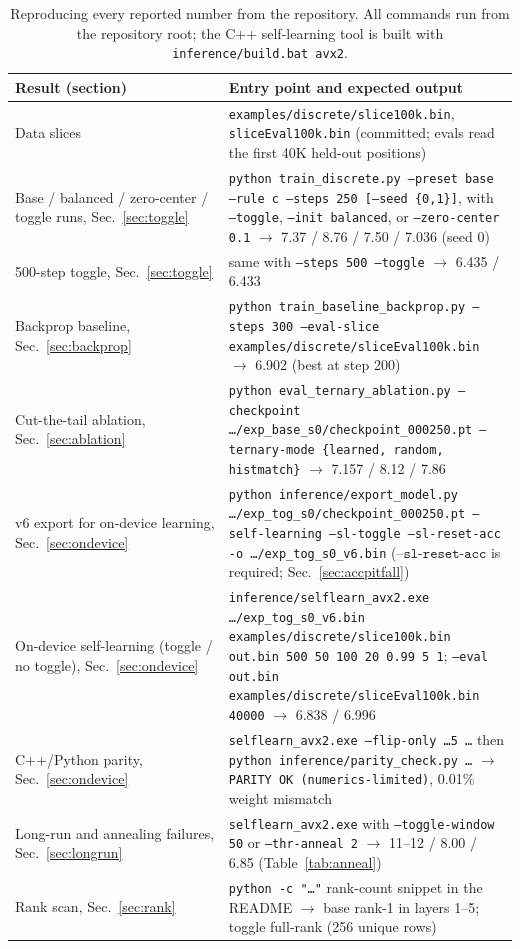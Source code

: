 \documentclass{article} %
\begin{document}
\begin{table}[t]
\caption{Reproducing every reported number from the repository. All commands run from the repository root; the C++ self-learning tool is built with \texttt{inference/build.bat avx2}.}
\label{tab:repro}
\begin{center}
\begin{tabular}{p{0.42\linewidth}p{0.58\linewidth}}
\toprule
\textbf{Result (section)} & \textbf{Entry point and expected output} \\
\midrule
Data slices & \texttt{examples/discrete/slice100k.bin}, \texttt{sliceEval100k.bin} (committed; evals read the first 40K held-out positions) \\
\hline
Base / balanced / zero-center / toggle runs, Sec.~\ref{sec:toggle} & \texttt{python train\_discrete.py --preset base --rule c --steps 250 [--seed \{0,1\}]}, with \texttt{--toggle}, \texttt{--init balanced}, or \texttt{--zero-center 0.1} $\rightarrow$ 7.37 / 8.76 / 7.50 / 7.036 (seed 0) \\
\hline
500-step toggle, Sec.~\ref{sec:toggle} & same with \texttt{--steps 500 --toggle} $\rightarrow$ 6.435 / 6.433 \\
\hline
Backprop baseline, Sec.~\ref{sec:backprop} & \texttt{python train\_baseline\_backprop.py --steps 300 --eval-slice examples/discrete/sliceEval100k.bin} $\rightarrow$ 6.902 (best at step 200) \\
\hline
Cut-the-tail ablation, Sec.~\ref{sec:ablation} & \texttt{python eval\_ternary\_ablation.py --checkpoint \ldots/exp\_base\_s0/checkpoint\_000250.pt --ternary-mode \{learned, random, histmatch\}} $\rightarrow$ 7.157 / 8.12 / 7.86 \\
\hline
v6 export for on-device learning, Sec.~\ref{sec:ondevice} & \texttt{python inference/export\_model.py \ldots/exp\_tog\_s0/checkpoint\_000250.pt --self-learning --sl-toggle --sl-reset-acc -o \ldots/exp\_tog\_s0\_v6.bin} ($\texttt{--sl-reset-acc}$ is required; Sec.~\ref{sec:accpitfall}) \\
\hline
On-device self-learning (toggle / no toggle), Sec.~\ref{sec:ondevice} & \texttt{inference/selflearn\_avx2.exe \ldots/exp\_tog\_s0\_v6.bin examples/discrete/slice100k.bin out.bin 500 50 100 20 0.99 5 1}; \texttt{--eval out.bin examples/discrete/sliceEval100k.bin 40000} $\rightarrow$ 6.838 / 6.996 \\
\hline
C++/Python parity, Sec.~\ref{sec:ondevice} & \texttt{selflearn\_avx2.exe --flip-only \ldots 5 \ldots} then \texttt{python inference/parity\_check.py \ldots} $\rightarrow$ \texttt{PARITY OK (numerics-limited)}, 0.01\% weight mismatch \\
\hline
Long-run and annealing failures, Sec.~\ref{sec:longrun} & \texttt{selflearn\_avx2.exe} with \texttt{--toggle-window 50} or \texttt{--thr-anneal 2} $\rightarrow$ 11--12 / 8.00 / 6.85 (Table~\ref{tab:anneal}) \\
\hline
Rank scan, Sec.~\ref{sec:rank} & \texttt{python -c "\ldots"} rank-count snippet in the README $\rightarrow$ base rank-1 in layers 1--5; toggle full-rank (256 unique rows) \\
\bottomrule
\end{tabular}
\end{center}
\end{table}
\end{document}
